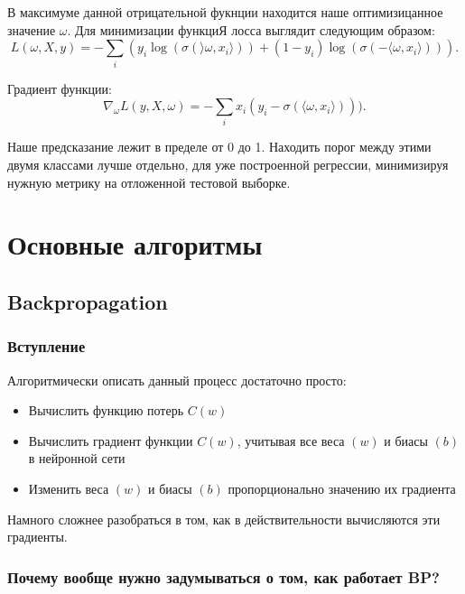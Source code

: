 \documentclass[a4paper, 10pt, openany]{book} %
\begin{document}
	В максимуме данной отрицательной фукнции находится наше оптимизицанное значение $\omega$. Для минимизации функциЯ лосса выглядит следующим образом:
	\begin{equation*}
		L(\omega, X, y) = -\sum_{i}(y_i \log(\sigma(\rangle\omega,x_i\rangle)) + (1 - y_i)\log(\sigma(-\langle\omega,x_i\rangle))).
	\end{equation*}
	
	Градиент функции:
	\begin{equation*}
		\nabla_\omega L(y, X, \omega) = - \sum_{i} x_i (y_i - \sigma(\langle\omega,x_i\rangle))).
	\end{equation*}
	
	Наше предсказание лежит в пределе от 0 до 1. Находить порог между этими двумя классами
	лучше отдельно, для уже построенной регрессии, минимизируя нужную метрику на отложенной тестовой выборке.
	
	\chapter{Основные алгоритмы}
	
	\section{Backpropagation}
	
	\subsection{Вступление}
	
	Алгоритмически описать данный процесс достаточно просто:
	
	\begin{itemize}
		\item Вычислить функцию потерь $C(w)$
		\item Вычислить градиент функции $C(w)$, учитывая все веса $(w)$ и биасы $(b)$ в нейронной сети
		\item Изменить веса $(w)$ и биасы $(b)$ пропорционально значению их градиента
	\end{itemize}
	
	Намного сложнее разобраться в том, как в действительности вычисляются эти градиенты.
	
	\subsection{Почему вообще нужно задумываться о том, как работает BP?}
	
\end{document}
